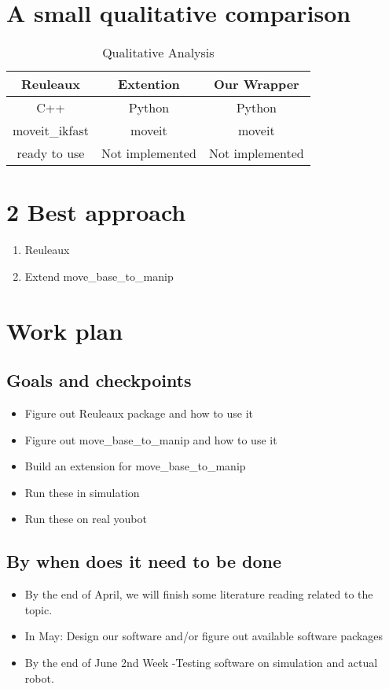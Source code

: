 \documentclass[12pt]{article}
\begin{document}
\section{A small qualitative comparison}
\begin{table}[htpb]
        \centering
        \caption{Qualitative Analysis}
        \label{tab:qualAna}
        \begin{tabular}{|c|c|c|}\hline
                \textbf{Reuleaux} & \textbf{Extention} & \textbf{Our Wrapper}\\\hline
                C++ & Python & Python\\\hline
                moveit\_ikfast & moveit & moveit \\\hline
                ready to use & Not implemented & Not implemented \\\hline
        \end{tabular}
\end{table}
\section{2 Best approach}
\begin{enumerate}
        \item Reuleaux
        \item Extend move\_base\_to\_manip
\end{enumerate}
\section{Work plan}
\subsection{Goals and checkpoints}
\begin{itemize}
        \item Figure out Reuleaux package and how to use it
        \item Figure out move\_base\_to\_manip and how to use it
        \item Build an extension for move\_base\_to\_manip
        \item Run these in simulation
        \item Run these on real youbot
\end{itemize}
\subsection{By when does it need to be done}
\begin{itemize}
\item By the end of April, we will finish some literature reading related to the topic.
\item In May: Design our software and/or figure out available software packages
\item By the end of June 2nd Week -Testing software on simulation and actual robot.
\end{itemize}
\end{document}
